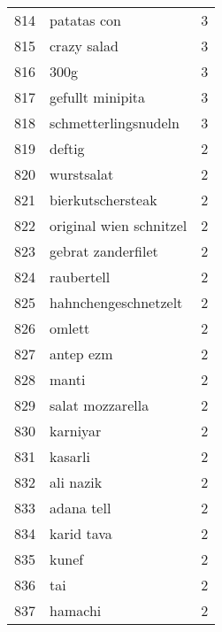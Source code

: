 \begin{tabular}{llr}
814  &                                        patatas con &      3 \\
815  &                                        crazy salad &      3 \\
816  &                                               300g &      3 \\
817  &                                   gefullt minipita &      3 \\
818  &                               schmetterlingsnudeln &      3 \\
819  &                                             deftig &      2 \\
820  &                                         wurstsalat &      2 \\
821  &                                  bierkutschersteak &      2 \\
822  &                            original wien schnitzel &      2 \\
823  &                                 gebrat zanderfilet &      2 \\
824  &                                         raubertell &      2 \\
825  &                               hahnchengeschnetzelt &      2 \\
826  &                                             omlett &      2 \\
827  &                                          antep ezm &      2 \\
828  &                                              manti &      2 \\
829  &                                   salat mozzarella &      2 \\
830  &                                           karniyar &      2 \\
831  &                                            kasarli &      2 \\
832  &                                          ali nazik &      2 \\
833  &                                         adana tell &      2 \\
834  &                                         karid tava &      2 \\
835  &                                              kunef &      2 \\
836  &                                                tai &      2 \\
837  &                                            hamachi &      2 \\

\end{tabular}
